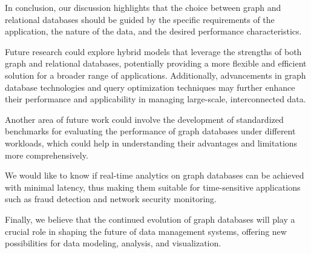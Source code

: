 In conclusion, our discussion highlights that the choice between graph and relational databases should be guided by the specific requirements of the application, the nature of the data, and the desired performance characteristics. 

Future research could explore hybrid models that leverage the strengths of both graph and relational databases, potentially providing a more flexible and efficient solution for a broader range of applications. Additionally, advancements in graph database technologies and query optimization techniques may further enhance their performance and applicability in managing large-scale, interconnected data. 

Another area of future work could involve the development of standardized benchmarks for evaluating the performance of graph databases under different workloads, which could help in understanding their advantages and limitations more comprehensively.

We would like to know if real-time analytics on graph databases can be achieved with minimal latency, thus making them suitable for time-sensitive applications such as fraud detection and network security monitoring.

Finally, we believe that the continued evolution of graph databases will play a crucial role in shaping the future of data management systems, offering new possibilities for data modeling, analysis, and visualization.